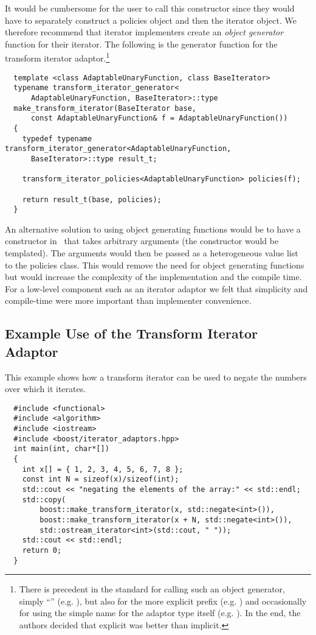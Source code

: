 \documentclass{netobjectdays}
\newcommand{\iteratoradaptor}{\code{iterator\_\-adaptor}}
\begin{document}
It would be cumbersome for the user to call this constructor since
they would have to separately construct a policies object and then the
iterator object. We therefore recommend that iterator implementers
create an \emph{object generator} function for their iterator. The
following is the generator function for the transform iterator
adaptor.\footnote{
    There is precedent in the standard for calling such
an object generator, simply ``''
(e.g. ), but also for the more explicit
 prefix (e.g. ) and occasionally
for using the simple name for the adaptor type itself
(e.g. ).  In the end, the authors decided
that explicit was better than implicit.  }

{\footnotesize
\begin{verbatim}
  template <class AdaptableUnaryFunction, class BaseIterator>
  typename transform_iterator_generator<
      AdaptableUnaryFunction, BaseIterator>::type
  make_transform_iterator(BaseIterator base,
      const AdaptableUnaryFunction& f = AdaptableUnaryFunction())
  {
    typedef typename transform_iterator_generator<AdaptableUnaryFunction,
      BaseIterator>::type result_t;

    transform_iterator_policies<AdaptableUnaryFunction> policies(f);

    return result_t(base, policies);
  }
\end{verbatim}
}

An alternative solution to using object generating functions would be
to have a constructor in \iteratoradaptor\ that takes arbitrary
arguments (the constructor would be templated). The arguments would
then be passed as a heterogeneous value list~\cite{TMPW00:Eisenecker}
to the policies class. This would remove the need for object
generating functions but would increase the complexity of the
implementation and the compile time. For a low-level component such as
an iterator adaptor we felt that simplicity and compile-time were more
important than implementer convenience.

\subsection{Example Use of the Transform Iterator Adaptor}

This example shows how a transform iterator can be used to
negate the numbers over which it iterates.

{\footnotesize
\begin{verbatim}
  #include <functional>
  #include <algorithm>
  #include <iostream>
  #include <boost/iterator_adaptors.hpp>
  int main(int, char*[])
  {
    int x[] = { 1, 2, 3, 4, 5, 6, 7, 8 };
    const int N = sizeof(x)/sizeof(int);
    std::cout << "negating the elements of the array:" << std::endl;
    std::copy(
        boost::make_transform_iterator(x, std::negate<int>()),
        boost::make_transform_iterator(x + N, std::negate<int>()),
        std::ostream_iterator<int>(std::cout, " "));
    std::cout << std::endl;
    return 0;
  }
\end{verbatim}
}
\end{document}

